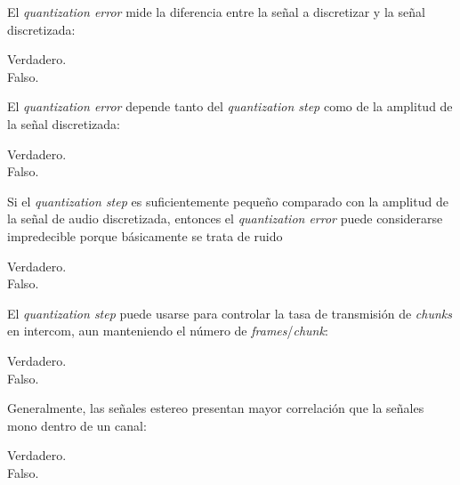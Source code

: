 \documentclass[legalpaper, 12pt, addpoints]{exam}
\begin{document}
\begin{questions}
\vspace{0.10in}

\question El \emph{quantization error} mide la diferencia entre la
señal a discretizar y la señal discretizada:

\begin{oneparchoices}
  \choice Verdadero.\\
  \choice Falso.
\end{oneparchoices}
  
\vspace{0.10in}

\question El \emph{quantization error} depende tanto del
\emph{quantization step} como de la amplitud de la señal discretizada:

\begin{oneparchoices}
  \choice Verdadero.\\
  \choice Falso.
\end{oneparchoices}
  
\vspace{0.10in}

\question Si el \emph{quantization step} es suficientemente pequeño
comparado con la amplitud de la señal de audio discretizada, entonces
el \emph{quantization error} puede considerarse impredecible porque
básicamente se trata de ruido

\begin{oneparchoices}
  \choice Verdadero.\\
  \choice Falso.
\end{oneparchoices}
  
\vspace{0.10in}

\question El \emph{quantization step} puede usarse para controlar la
tasa de transmisión de \emph{chunks} en intercom, aun manteniendo el número de
\emph{frames}/\emph{chunk}:

\begin{oneparchoices}
  \choice Verdadero.\\
  \choice Falso.
\end{oneparchoices}
  
\vspace{0.10in}

\question Generalmente, las señales estereo presentan mayor
correlación que la señales mono dentro de un canal:

\begin{oneparchoices}
  \choice Verdadero.\\
  \choice Falso.
\end{oneparchoices}
  

\end{questions}
\end{document}
